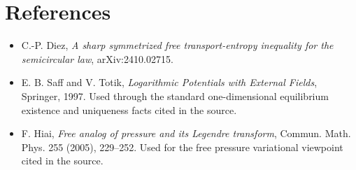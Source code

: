 \documentclass[11pt]{article}
\begin{document}
\section*{References}

\begin{itemize}
\item C.-P. Diez, \emph{A sharp symmetrized free transport-entropy inequality
for the semicircular law}, arXiv:2410.02715.
\item E. B. Saff and V. Totik, \emph{Logarithmic Potentials with External
Fields}, Springer, 1997. Used through the standard one-dimensional equilibrium
existence and uniqueness facts cited in the source.
\item F. Hiai, \emph{Free analog of pressure and its Legendre transform},
Commun. Math. Phys. 255 (2005), 229--252. Used for the free pressure
variational viewpoint cited in the source.
\end{itemize}
\end{document}
